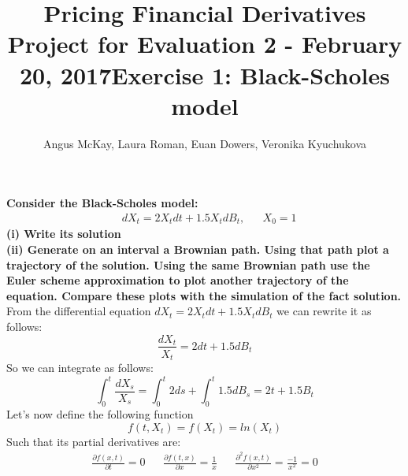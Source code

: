 \documentclass[12pt]{article}
\begin{document}
\title{Pricing Financial Derivatives   \\ Project for Evaluation 2 - February 20, 2017}
\author{Angus McKay, Laura Roman, Euan Dowers, Veronika Kyuchukova}
\date{}
\maketitle

\title {{\bf Exercise 1:} {\bf Black-Scholes model }}
{\bf Consider the Black-Scholes model:}
\begin{align*}
& dX_t = 2X_t dt + 1.5X_tdB_t, && X_0=1
\end{align*}
{\bf (i) Write its solution \\
(ii) Generate on an interval a Brownian path. Using that path plot a trajectory of the solution. Using the same Brownian path use the Euler scheme approximation to plot another trajectory of the equation. Compare these plots with the simulation of the fact solution.} \\

From the differential equation $dX_t = 2X_t dt + 1.5X_tdB_t$ we can rewrite it as follows:
\begin{equation}
\frac{dX_t}{X_t} = 2dt + 1.5dB_t
\end{equation}
So we can integrate as follows:
\begin{equation} \label{uno}
\int_0^t \frac{dX_s}{X_s} = \int_0^t2ds + \int_0^t 1.5dB_s = 2t + 1.5B_t
\end{equation}
Let's now define the following function
\begin{equation}
f(t,X_t)= f(X_t)= ln(X_t)
\end{equation}
Such that its partial derivatives are:
\begin{align}
 \frac{\partial f(x,t)}{\partial t}= 0 &&
 \frac{\partial f(t,x)}{\partial x} = \frac{1}{x}&&
 \frac{\partial^2f(x,t)}{\partial x^2} = \frac{-1}{x^2}  = 0 
\end{align}
\end{document}
